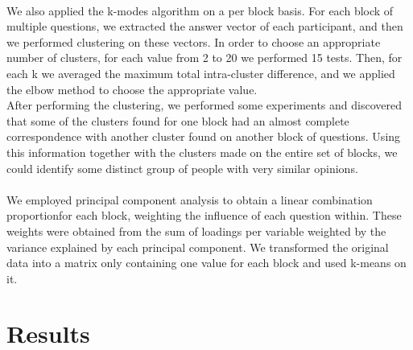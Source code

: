\documentclass{article}
\begin{document}
\paragraph{}
We also applied the k-modes algorithm on a per block basis. For each block of multiple questions, we extracted the answer vector of each participant, and then we performed clustering on these vectors. In order to choose an appropriate number of clusters, for each value from 2 to 20 we performed 15 tests. Then, for each k we averaged the maximum total intra-cluster difference, and we applied the elbow method to choose the appropriate value. \\
After performing the clustering, we performed some experiments and discovered that some of the clusters found for one block had an almost complete correspondence with another cluster found on another block of questions. Using this information together with the clusters made on the entire set of blocks, we could identify some distinct group of people with very similar opinions.

\paragraph{}
We employed principal component analysis to obtain a linear combination proportionfor each block, weighting the influence of each question within.
These weights were obtained from the sum of loadings per variable weighted by the variance explained by each principal component.
We transformed the original data into a matrix only containing one value for each block and used k-means on it.

\section{Results}
\end{document}
